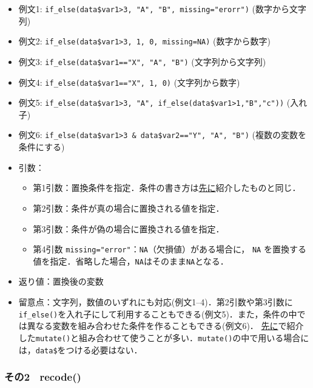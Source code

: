 \documentclass[
  xelatex, ja=standard]{bxjsarticle}
\providecommand{\tightlist}{%
  \setlength{\itemsep}{0pt}\setlength{\parskip}{0pt}}
\begin{document}
\begin{itemize}
\tightlist
\item
  例文1:
  \texttt{if\_else(data\$var1\textgreater{}3,\ "A",\ "B",\ missing="erorr")}
  (数字から文字列)
\item
  例文2:
  \texttt{if\_else(data\$var1\textgreater{}3,\ 1,\ 0,\ missing=NA)}
  (数字から数字)
\item
  例文3: \texttt{if\_else(data\$var1=="X",\ "A",\ "B")}
  (文字列から文字列)
\item
  例文4: \texttt{if\_else(data\$var1=="X",\ 1,\ 0)} (文字列から数字)
\item
  例文5:
  \texttt{if\_else(data\$var1\textgreater{}3,\ "A",\ if\_else(data\$var1\textgreater{}1,"B","c"))}
  (入れ子)
\item
  例文6:
  \texttt{if\_else(data\$var1\textgreater{}3\ \&\ data\$var2=="Y",\ "A",\ "B")}
  (複数の変数を条件にする)
\item
  引数：

  \begin{itemize}
  \tightlist
  \item
    第1引数：置換条件を指定．条件の書き方は\hyperref[ux6761ux4ef6ux306bux5408ux81f4ux3059ux308bux30c7ux30fcux30bfux306eux62bdux51fa]{先に}紹介したものと同じ．
  \item
    第2引数：条件が真の場合に置換される値を指定．
  \item
    第3引数：条件が偽の場合に置換される値を指定．
  \item
    第4引数
    \texttt{missing="error"}：\texttt{NA}（欠損値）がある場合に，
    \texttt{NA}
    を置換する値を指定．省略した場合，\texttt{NA}はそのまま\texttt{NA}となる．
  \end{itemize}
\item
  返り値：置換後の変数
\item
  留意点：文字列，数値のいずれにも対応(例文1--4)．第2引数や第3引数に\texttt{if\_else()}を入れ子にして利用することもできる(例文5)．また，条件の中では異なる変数を組み合わせた条件を作ることもできる(例文6)．
  \hyperref[ux8907ux6570ux306eux5909ux6570ux3092ux307eux3068ux3081ux3066ux8ffdux52a0ux3059ux308b]{先に}で紹介した\texttt{mutate()}と組み合わせて使うことが多い．\texttt{mutate()}の中で用いる場合には，\texttt{data\$}をつける必要はない．
\end{itemize}

\subsubsection{その2　recode()}\label{ux305dux306e2-recode}
\end{document}
